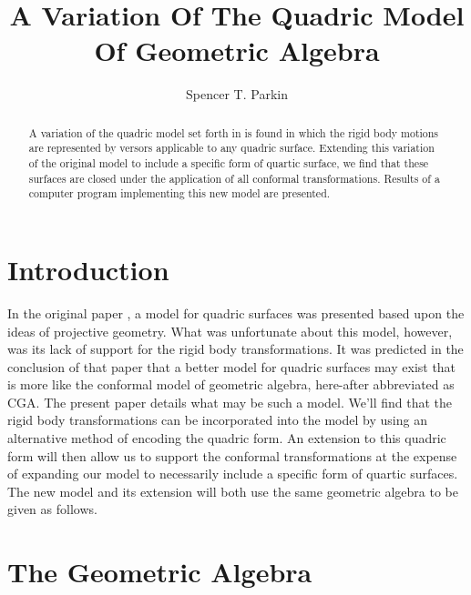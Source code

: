 \documentclass{birkjour}
\theoremstyle{definition}
\theoremstyle{remark}
\numberwithin{equation}{section}
\begin{document}
\title{A Variation Of The Quadric Model\\Of Geometric Algebra}

\author{Spencer T. Parkin}





\begin{abstract}
A variation of the quadric model set forth in \cite{Parkin12} is
found in which the rigid body motions are represented by
versors applicable to any quadric surface.
Extending this variation of the original model to include
a specific form of quartic surface, we find that these surfaces are
closed under the application of all conformal transformations.
Results of a computer program implementing this new model are presented.
\end{abstract}

\maketitle

\section{Introduction}

In the original paper \cite{Parkin12}, a model for quadric surfaces was
presented based upon the ideas of projective geometry.  What was unfortunate
about this model, however, was its lack of support for the rigid body transformations.  It was
predicted in the conclusion of that paper that a better model for quadric
surfaces may exist that is more like the conformal model of geometric algebra, here-after
abbreviated as CGA.
The present paper details what may be such a model.  We'll find that the rigid
body transformations can be incorporated into the model by using an alternative
method of encoding the quadric form.  An extension to this quadric form
will then allow us to support the conformal transformations at the expense of
expanding our model to necessarily include a specific form of quartic surfaces.  The
new model and its extension will both use the same geometric algebra to be given as follows.

\section{The Geometric Algebra}
\end{document}

